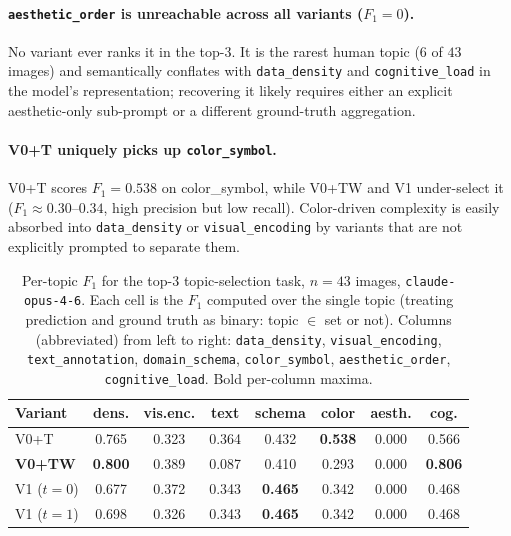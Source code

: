 \paragraph{\texttt{aesthetic\_order} is unreachable across all
variants ($F_1 = 0$).} No variant ever ranks it in the top-3. It is
the rarest human topic ($6$ of $43$ images) and semantically
conflates with \texttt{data\_density} and \texttt{cognitive\_load}
in the model's representation; recovering it likely requires either
an explicit aesthetic-only sub-prompt or a different
ground-truth aggregation.

\paragraph{V0+T uniquely picks up \texttt{color\_symbol}.}
V0+T scores $F_1 = 0.538$ on color\_symbol, while V0+TW and V1
under-select it ($F_1 \approx 0.30$--$0.34$, high precision but low
recall). Color-driven complexity is easily absorbed into
\texttt{data\_density} or \texttt{visual\_encoding} by variants
that are not explicitly prompted to separate them.

\begin{table}[h]
\centering
\caption{Per-topic $F_1$ for the top-3 topic-selection task,
$n = 43$ images, \texttt{claude-opus-4-6}. Each cell is the $F_1$
computed over the single topic (treating prediction and ground truth
as binary: topic $\in$ set or not). Columns (abbreviated) from left to
right: \texttt{data\_density}, \texttt{visual\_encoding},
\texttt{text\_annotation}, \texttt{domain\_schema},
\texttt{color\_symbol}, \texttt{aesthetic\_order},
\texttt{cognitive\_load}. Bold per-column maxima.}
\label{tab:topicsel-pertopic}
\scriptsize
\setlength{\tabcolsep}{3pt}
\begin{tabular*}{\linewidth}{@{\extracolsep{\fill}}lccccccc@{}}
\toprule
Variant & dens. & vis.enc. & text & schema & color & aesth. & cog. \\
\midrule
V0+T           & 0.765 & 0.323 & 0.364 & 0.432 & \textbf{0.538} & 0.000 & 0.566 \\
\textbf{V0+TW} & \textbf{0.800} & 0.389 & 0.087 & 0.410 & 0.293 & 0.000 & \textbf{0.806} \\
V1 ($t=0$)     & 0.677 & 0.372 & 0.343 & \textbf{0.465} & 0.342 & 0.000 & 0.468 \\
V1 ($t=1$)     & 0.698 & 0.326 & 0.343 & \textbf{0.465} & 0.342 & 0.000 & 0.468 \\
\bottomrule
\end{tabular*}
\end{table}

